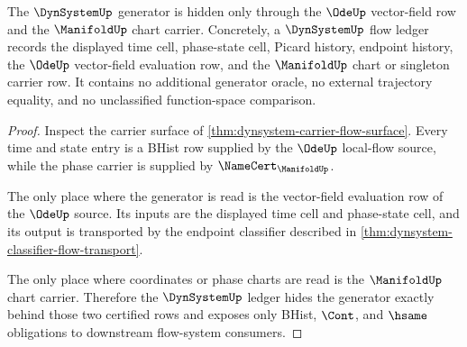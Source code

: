 \begin{theorem}
\label{thm:dynsystem-ode-generator-ledger}
The $\DynSystemUp$ generator is hidden only through the $\OdeUp$ vector-field
row and the $\ManifoldUp$ chart carrier. Concretely, a $\DynSystemUp$ flow
ledger records the displayed time cell, phase-state cell, Picard history,
endpoint history, the $\OdeUp$ vector-field evaluation row, and the
$\ManifoldUp$ chart or singleton carrier row. It contains no additional
generator oracle, no external trajectory equality, and no unclassified
function-space comparison.
\end{theorem}
\begin{proof}
Inspect the carrier surface of
\autoref{thm:dynsystem-carrier-flow-surface}. Every time and state entry is a
BHist row supplied by the $\OdeUp$ local-flow source, while the phase carrier
is supplied by $\NameCert_{\ManifoldUp}$.

The only place where the generator is read is the vector-field evaluation row
of the $\OdeUp$ source. Its inputs are the displayed time cell and phase-state
cell, and its output is transported by the endpoint classifier described in
\autoref{thm:dynsystem-classifier-flow-transport}.

The only place where coordinates or phase charts are read is the
$\ManifoldUp$ chart carrier. Therefore the $\DynSystemUp$ ledger hides the
generator exactly behind those two certified rows and exposes only BHist,
$\Cont$, and $\hsame$ obligations to downstream flow-system consumers.
\end{proof}

